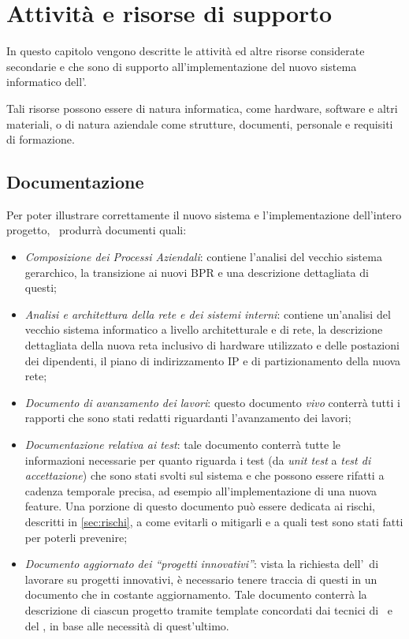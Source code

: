 \chapter{Attività e risorse di supporto}\label{ch:supporto}

In questo capitolo vengono descritte le attività ed altre risorse considerate secondarie e che sono di supporto all'implementazione del nuovo sistema informatico dell'\istituto.

Tali risorse possono essere di natura informatica, come hardware, software e altri materiali, o di natura aziendale come strutture, documenti, personale e requisiti di formazione.

\section{Documentazione}

	Per poter illustrare correttamente il nuovo sistema e l'implementazione dell'intero progetto, \azienda~produrrà documenti quali:
	\begin{itemize}[noitemsep]
		
		\item \textit{Composizione dei Processi Aziendali}: contiene l'analisi del vecchio sistema gerarchico, la transizione ai nuovi BPR e una descrizione dettagliata di questi;
		
		\item \textit{Analisi e architettura della rete e dei sistemi interni}: contiene un'analisi del vecchio sistema informatico a livello architetturale e di rete, la descrizione dettagliata della nuova reta inclusivo di hardware utilizzato e delle postazioni dei dipendenti, il piano di indirizzamento IP e di partizionamento della nuova rete;

		\item \textit{Documento di avanzamento dei lavori}: questo documento \textit{vivo} conterrà tutti i rapporti che sono stati redatti riguardanti l'avanzamento dei lavori;
		
		\item \textit{Documentazione relativa ai test}: tale documento conterrà tutte le informazioni necessarie per quanto riguarda i test (da \textit{unit test} a \textit{test di accettazione}) che sono stati svolti sul sistema e che possono essere rifatti a cadenza temporale precisa, ad esempio all'implementazione di una nuova feature.
		Una porzione di questo documento può essere dedicata ai rischi, descritti in \ref{sec:rischi}, a come evitarli o mitigarli e a quali test sono stati fatti per poterli prevenire;
		
		\item \textit{Documento aggiornato dei ``progetti innovativi''}: vista la richiesta dell'\istituto~di lavorare su progetti innovativi, è necessario tenere traccia di questi in un documento che in costante aggiornamento.
		Tale documento conterrà la descrizione di ciascun progetto tramite template concordati dai tecnici di \azienda~e del \proponente, in base alle necessità di quest'ultimo.
		
	\end{itemize}

